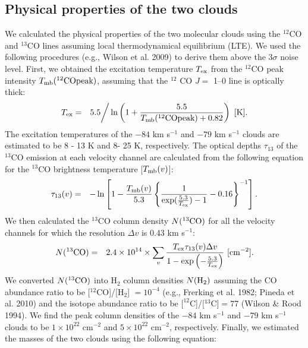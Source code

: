 \documentclass[onecolumn]{pasj01}
\begin{document}
{{{{\subsection{{Physical properties of {the} two clouds}}
We calculated the physical properties of the two molecular clouds using {the} $^{12}$CO {and} $^{13}$CO lines assuming local {thermodynamical} equilibrium (LTE). {We used} the following procedures  (e.g., Wilson et al. 2009) {to derive} them above the $3\sigma$ noise level.
{First, we obtained the} excitation temperature $T_{\rm ex}$ from the $^{12}$CO peak intensity $T_{\rm mb}(\rm ^{12}CO peak)$, assuming {that} the $^{12}$ CO $J=$ 1--0 line is optically thick:
\begin{eqnarray}
T_{\rm ex} &=& 5.5 \bigg/ \ln \left(1+ {5.5 \over T_{\rm mb}(\rm ^{12}CO peak) + 0.82 }\right) {\    [\rm K]}.
\label{eq:75}
\end{eqnarray}
The excitation temperature{s} of {the $-84$ km s$^{-1}$ and $-79$ km s$^{-1}$ {clouds} are estimated {to be} 8 - 13 K and 8- 25 K, respectively.}
The optical depth{s $\tau_{13}$} of the $^{13}$CO emission at {each} velocity channel {are} calculated {from the} following equation {for} {the} $^{13}$CO brightness temperature [$T_{\rm mb}(v)$]:
\begin{eqnarray}
\tau_{13} (v) &=& -\ln \left[1-{T_{\rm mb}(v) \over 5.3} \left\{ {1 \over \exp({5.3 \over T_{\rm ex}})-1}-0.16 \right\}^{-1} \right].
\label{eq:75}
\end{eqnarray}
{We then} calculated the $^{13}$CO column density {$N ({\rm ^{13}CO})$ for all the velocity} channels {{for which the} resolution $\Delta v$ is} 0.43 km s$^{-1}$:
\begin{eqnarray}
N ({\rm ^{13}CO}) &=& 2.4 \times 10^{14} \times \sum_v {T_{{\rm ex}} \tau_{13} (v) \Delta v \over 1-\exp \left(-{5.3 \over T_{\rm ex}} \right) } {\   [\rm cm^{-2}]}{.}
\label{eq:75}
\end{eqnarray}
{We converted} {$N ({\rm ^{13}CO})$} into H$_2$ column {densities} $N(\rm H_2)$ assuming the {CO abundance {ratio to be} [$^{12}$CO]/[H$_2$] $= 10^{-4}$ (e.g., Frerking et al. 1982; Pineda et al. 2010) and the {isotope} abundance ratio {to be} $[^{12}$C]/[$^{13}$C$] = 77$ (Wilson \& Rood 1994). 
{We find the} peak column {densities} of {the $-84$ km s$^{-1}$ and $-79$ km s$^{-1}$ cloud{s} {to be} $1 \times 10^{22}$ cm$^{-2}$ and $5 \times 10^{22}$ cm$^{-2}$, respectively.}
Finally, we estimated the mass{es} of {the} two cloud{s} using {the} following equation:
\begin{eqnarray}

\end{eqnarray}}}}}}
\end{document}
